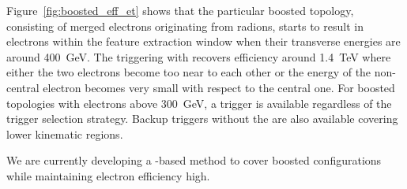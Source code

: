 
Figure~\ref{fig:boosted_eff_et} shows that the particular boosted topology,
consisting of merged electrons originating from radions, starts to result in
electrons within the feature extraction window when their transverse energies
are around \SI{400}{\GeV}. The triggering with \rnn{} recovers efficiency around
\SI{1.4}{\TeV} where either the two electrons become too near to each other or
the energy of the non-central electron becomes very small with respect to the
central one. For boosted topologies with electrons above \SI{300}{\GeV}, a
trigger is available regardless of the trigger selection strategy. Backup
triggers without the \rnn{} are also available covering lower kinematic regions.

We are currently developing a \rnn{}-based method to cover boosted
configurations while maintaining electron efficiency high.


